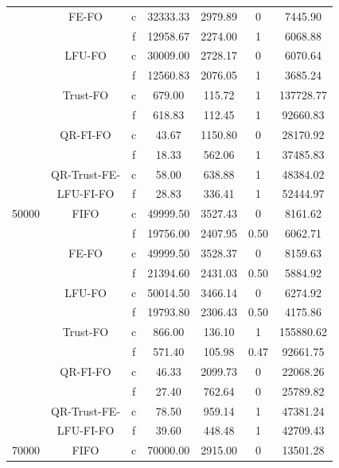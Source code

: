 \begin{center}
\begin{longtable}{|c||c||c|c|c|c|c|}
	      & FE-FO & c & 32333.33 & 2979.89 & 0 & 7445.90 \\        \cline{3-7}
	      &       & f & 12958.67 & 2274.00 & 1 & 6068.88 \\ \cline{2-7}
	      & LFU-FO & c & 30009.00 & 2728.17 & 0 & 6070.64 \\       \cline{3-7}
	      &        & f & 12560.83 & 2076.05 & 1 & 3685.24\\ \cline{2-7}
	      & Trust-FO & c & 679.00 & 115.72 & 1 & 137728.77 \\     \cline{3-7}
	      &          & f & 618.83 & 112.45 & 1 & 92660.83 \\ \cline{2-7}
	      & QR-FI-FO & c & 43.67 & 1150.80 & 0 &  28170.92 \\     \cline{3-7}
	      &          & f & 18.33 & 562.06 & 1 & 37485.83 \\ \cline{2-7}
	      & QR-Trust-FE- & c & 58.00 & 638.88 & 1 & 48384.02 \\  \cline{3-7}
	      & LFU-FI-FO    & f & 28.83 & 336.41 & 1 & 52444.97 \\ \hhline{|=#=#=|=|=|=|=|}
	50000 & FIFO & c  & 49999.50 & 3527.43 & 0 & 8161.62 \\        \cline{3-7}
	      &      & f  & 19756.00 & 2407.95 & 0.50 & 6062.71\\     \cline{2-7}
	      & FE-FO & c & 49999.50 & 3528.37 & 0 & 8159.63 \\        \cline{3-7}
	      &       & f & 21394.60 & 2431.03 & 0.50 & 5884.92 \\     \cline{2-7}
	      & LFU-FO & c & 50014.50 & 3466.14 & 0 & 6274.92 \\       \cline{3-7}
	      &        & f & 19793.80 & 2306.43 & 0.50 & 4175.86 \\    \cline{2-7}
	      & Trust-FO & c & 866.00 & 136.10 & 1 & 155880.62 \\     \cline{3-7}
	      &          & f & 571.40 & 105.98 & 0.47 & 92661.75 \\  \cline{2-7}
	      & QR-FI-FO & c & 46.33 & 2099.73 & 0 & 22068.26 \\     \cline{3-7}
	      &          & f & 27.40 & 762.64 & 0 & 25789.82\\  \cline{2-7}
	      & QR-Trust-FE- & c & 78.50 & 959.14 & 1 & 47381.24 \\  \cline{3-7}
	      & LFU-FI-FO & f & 39.60 & 448.48 & 1 & 42709.43 \\ \hhline{|=#=#=|=|=|=|=|}
	70000 & FIFO & c  & 70000.00 & 2915.00 & 0 & 13501.28 \\        \cline{3-7}

\end{longtable}
\end{center}
